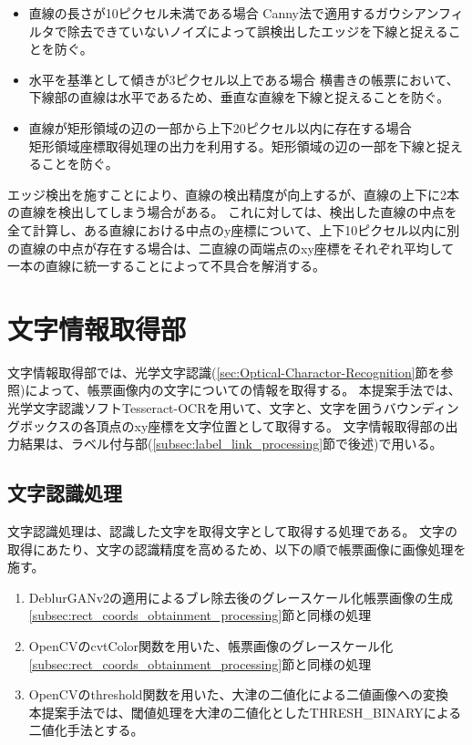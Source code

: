 \begin{itemize}
    \item 直線の長さが10ピクセル未満である場合
        Canny法で適用するガウシアンフィルタで除去できていないノイズによって誤検出したエッジを下線と捉えることを防ぐ。
    \item 水平を基準として傾きが3ピクセル以上である場合
        横書きの帳票において、下線部の直線は水平であるため、垂直な直線を下線と捉えることを防ぐ。
    \item 直線が矩形領域の辺の一部から上下20ピクセル以内に存在する場合\\
        矩形領域座標取得処理の出力を利用する。矩形領域の辺の一部を下線と捉えることを防ぐ。
\end{itemize}

エッジ検出を施すことにより、直線の検出精度が向上するが、直線の上下に2本の直線を検出してしまう場合がある。
これに対しては、検出した直線の中点を全て計算し、ある直線における中点のy座標について、上下10ピクセル以内に別の直線の中点が存在する場合は、二直線の両端点のxy座標をそれぞれ平均して一本の直線に統一することによって不具合を解消する。

\section{文字情報取得部}\label{sec:OCR_part}
文字情報取得部では、光学文字認識(\ref{sec:Optical-Charactor-Recognition}節を参照)によって、帳票画像内の文字についての情報を取得する。
本提案手法では、光学文字認識ソフトTesseract-OCRを用いて、文字と、文字を囲うバウンディングボックスの各頂点のxy座標を文字位置として取得する。
文字情報取得部の出力結果は、ラベル付与部(\ref{subsec:label_link_processing}節で後述)で用いる。

\subsection{文字認識処理}\label{subsec:char_recognition_processing}
文字認識処理は、認識した文字を取得文字として取得する処理である。
文字の取得にあたり、文字の認識精度を高めるため、以下の順で帳票画像に画像処理を施す。

\begin{enumerate}
    \item DeblurGANv2の適用によるブレ除去後のグレースケール化帳票画像の生成\\
        \ref{subsec:rect_coords_obtainment_processing}節と同様の処理
    \item OpenCVのcvtColor関数を用いた、帳票画像のグレースケール化\\
        \ref{subsec:rect_coords_obtainment_processing}節と同様の処理
    \item OpenCVのthreshold関数を用いた、大津の二値化による二値画像への変換\\
        本提案手法では、閾値処理を大津の二値化としたTHRESH\_BINARYによる二値化手法とする。
\end{enumerate}

